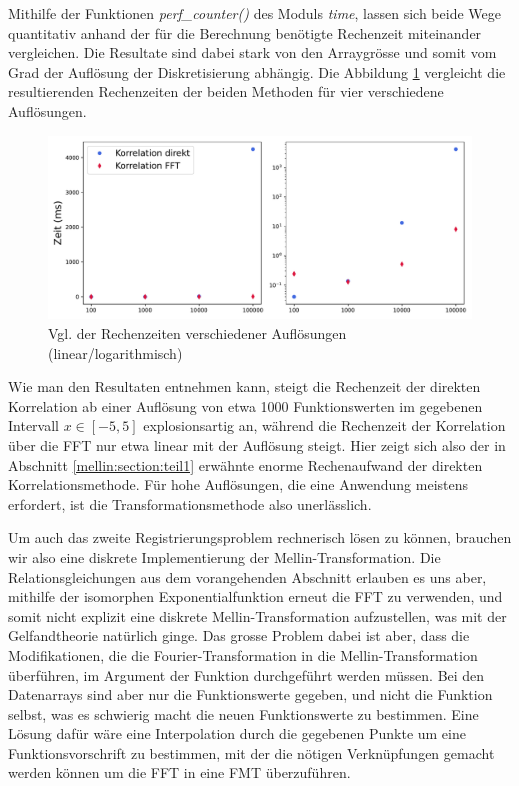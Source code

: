 Mithilfe der Funktionen {\em perf\_counter()} des Moduls {\em time}, lassen sich beide 
Wege quantitativ anhand der für die Berechnung benötigte Rechenzeit miteinander 
vergleichen.
Die Resultate sind dabei stark von den Arraygrösse und somit vom Grad der Auflösung 
der Diskretisierung abhängig.
Die Abbildung \ref{fig:mellin:zeiten} vergleicht die resultierenden Rechenzeiten 
der beiden Methoden für vier verschiedene Auflösungen.
\begin{figure}
    \centering
    \includegraphics[width=\textwidth]{papers/mellin/images/zeiten.pdf}
    \caption{Vgl. der Rechenzeiten verschiedener Auflösungen (linear/logarithmisch)}
    \label{fig:mellin:zeiten}
\end{figure}
Wie man den Resultaten entnehmen kann, steigt die Rechenzeit der direkten Korrelation
ab einer Auflösung von etwa 1000 Funktionswerten im gegebenen Intervall 
$x\in \left[-5,5\right]$ explosionsartig an, während die Rechenzeit der Korrelation 
über die FFT nur etwa linear mit der Auflösung steigt.
Hier zeigt sich also der in Abschnitt \ref{mellin:section:teil1} erwähnte enorme 
Rechenaufwand der direkten Korrelationsmethode.
Für hohe Auflösungen, die eine Anwendung meistens erfordert, ist die 
Transformationsmethode also unerlässlich.

Um auch das zweite Registrierungsproblem rechnerisch lösen zu können, brauchen wir also 
eine diskrete Implementierung der Mellin-Transformation.
Die Relationsgleichungen aus dem vorangehenden Abschnitt erlauben es uns aber, mithilfe 
der isomorphen Exponentialfunktion erneut die FFT zu verwenden, und somit nicht explizit 
eine diskrete Mellin-Transformation aufzustellen, was mit der Gelfandtheorie natürlich ginge.
Das grosse Problem dabei ist aber, dass die Modifikationen, die die Fourier-Transformation
in die Mellin-Transformation überführen, im Argument der Funktion durchgeführt werden 
müssen.
Bei den Datenarrays sind aber nur die Funktionswerte gegeben, und nicht die Funktion 
selbst, was es schwierig macht die neuen Funktionswerte zu bestimmen.
Eine Lösung dafür wäre eine Interpolation durch die gegebenen Punkte um eine 
Funktionsvorschrift zu bestimmen, mit der die nötigen Verknüpfungen gemacht werden 
können um die FFT in eine FMT überzuführen.

